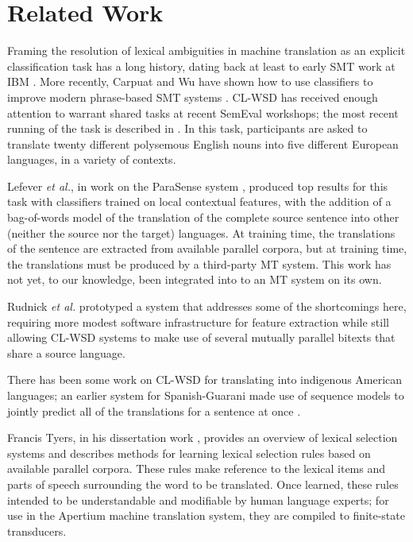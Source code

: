 \documentclass[10pt, a4paper]{article}
\begin{document}
\section{Related Work}
Framing the resolution of lexical ambiguities in machine translation
as an explicit classification
task has a long history, dating back at least to early SMT work at IBM
\cite{Brown91word-sensedisambiguation}.  More recently, Carpuat and Wu have
shown how to use classifiers to improve modern phrase-based SMT systems
\cite{carpuatpsd}.
CL-WSD has received enough attention to warrant shared tasks at recent SemEval
workshops; the most recent running of the task is described in \cite{task10}.
In this task, participants are asked to translate twenty different polysemous
English nouns into five different European languages, in a variety of contexts.

Lefever \emph{et al.}, in work on the ParaSense system
, produced top results for
this task with classifiers trained on local contextual features, with the 
addition of a bag-of-words model of the translation of the complete source
sentence into other (neither the source nor the target) languages. At training
time, the translations of the sentence are extracted from available parallel
corpora, but at training time, the translations must be produced by a
third-party MT system.
This work has not yet, to our knowledge, been integrated into to an MT system
on its own.

Rudnick \emph{et al.} 
prototyped a system that addresses some of the shortcomings here, requiring
more modest software infrastructure for feature extraction while still allowing
CL-WSD systems to make use of several mutually parallel bitexts that share a
source language.

There has been some work on CL-WSD for translating into indigenous American
languages; an earlier system for Spanish-Guarani made use of sequence models to
jointly predict all of the translations for a sentence at once
\cite{rudnick-gasser:2013:HyTra}.

Francis Tyers, in his dissertation work \cite{tyers-dissertation}, provides an
overview of lexical selection systems and describes methods for learning
lexical selection rules based on available parallel corpora. These rules make
reference to the lexical items and parts of speech surrounding the word to be
translated. Once learned, these rules intended to be understandable and
modifiable by human language experts; for use in the Apertium machine
translation system, they are compiled to finite-state transducers.
\end{document}

